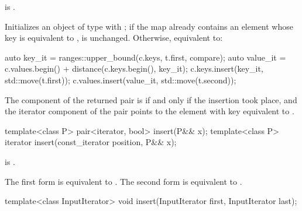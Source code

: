 \begin{itemdescr}
\pnum
\constraints
{} is .

\pnum
\effects
Initializes an object  of type 
with ;
if the map already contains an element
whose key is equivalent to ,
 is unchanged.
Otherwise, equivalent to:
\begin{codeblock}
auto key_it = ranges::upper_bound(c.keys, t.first, compare);
auto value_it = c.values.begin() + distance(c.keys.begin(), key_it);
c.keys.insert(key_it, std::move(t.first));
c.values.insert(value_it, std::move(t.second));
\end{codeblock}

\pnum
\returns
The  component of the returned pair is 
if and only if the insertion took place, and
the iterator component of the pair points to
the element with key equivalent to .
\end{itemdescr}

%
\begin{itemdecl}
template<class P> pair<iterator, bool> insert(P&& x);
template<class P> iterator insert(const_iterator position, P&& x);
\end{itemdecl}

\begin{itemdescr}
\pnum
\constraints
{} is .

\pnum
\effects
The first form is equivalent to .
The second form is equivalent to
.
\end{itemdescr}

%
\begin{itemdecl}
template<class InputIterator>
  void insert(InputIterator first, InputIterator last);
\end{itemdecl}

